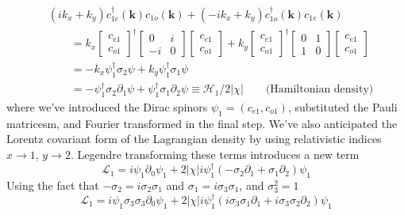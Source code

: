 \documentclass{report}
\begin{document}
\begin{align*}
	& \left(i k_x + k_y\right) c_{1e}^\dagger(\mathbf{k}) c_{1o}
	(\mathbf{k}) +
	\left(-i k_x + k_y\right) c_{1o}^\dagger(\mathbf{k}) c_{1e}
	(\mathbf{k}) \\
	&\qquad = k_x 
	\begin{bmatrix}
	c_{e1}\\ c_{o1}
	\end{bmatrix}^\dagger
	\begin{bmatrix}
	0 & i \\ -i & 0
	\end{bmatrix}
	\begin{bmatrix}
	c_{e1}\\ c_{o1}
	\end{bmatrix}
	+
	k_y
	\begin{bmatrix}
	c_{e1}\\ c_{o1}
	\end{bmatrix}^\dagger
	\begin{bmatrix}
	0 & 1 \\ 1 & 0
	\end{bmatrix}
	\begin{bmatrix}
	c_{e1}\\ c_{o1}
	\end{bmatrix}\\ 
	&\qquad 
	= -k_x \psi^\dagger_1 \sigma_2 \psi + k_y \psi^\dagger_1 \sigma_1 \psi\\
	&\qquad 
	= -\psi^\dagger_1 \sigma_2\partial_1 \psi + \psi^\dagger_1 \sigma_1\partial_2 \psi
	\equiv \mathcal{H}_1/ 2|\chi|\qquad \text{(Hamiltonian density)}
\end{align*}
where we've introduced the Dirac spinors $ \psi_1 = (c_{e1}, c_{o1}) $,
substituted the Pauli matricesm, and Fourier transformed in the final
step. We've also anticipated the Lorentz covariant form of the Lagrangian 
density by using relativistic indices $ x \rightarrow 1 $, $ y \rightarrow 2 $.
Legendre transforming these terms introduces a new term 
\begin{equation*}
	\mathcal{L}_1 = i\psi_1 \partial_0 \psi_1 
		+ 2|\chi|i\psi_1^\dagger(-\sigma_2 \partial_1 + \sigma_1 \partial_2)\psi_1
\end{equation*}
Using the fact that $ -\sigma_2 = i\sigma_2 \sigma_1 $ and $ \sigma_1 = i\sigma_3\sigma_1 $,
and $ \sigma_3^2 = 1 $
\begin{equation*}
	\mathcal{L}_1 = i \psi_1 \sigma_3 \sigma_3\partial_0 \psi_1 
		+ 2|\chi|i\psi_1^\dagger(i\sigma_3\sigma_1 \partial_1 + i\sigma_3\sigma_2 \partial_2)\psi_1
\end{equation*}
\end{document}
